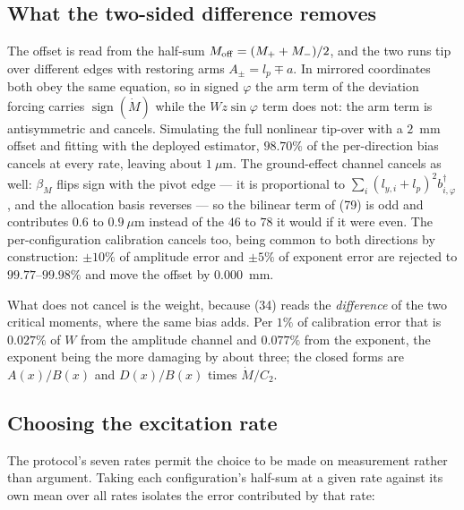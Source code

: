 \documentclass[10pt]{article}
\newcommand{\Mdot}{\dot M}
\begin{document}
\subsection{What the two-sided difference removes}

The offset is read from the half-sum $M_{\rm off} = (M_+ + M_-)/2$, and
the two runs tip over different edges with restoring arms
$A_\pm = l_p\mp a$. In mirrored coordinates both obey the same equation,
so in signed $\varphi$ the arm term of the deviation forcing carries
$\operatorname{sign}(\Mdot)$ while the $Wz\sin\varphi$ term does not: the
arm term is antisymmetric and cancels. Simulating the full nonlinear
tip-over with a $2$~mm offset and fitting with the deployed estimator,
$98.70\%$ of the per-direction bias cancels at every rate, leaving about
$1~\mu$m. The ground-effect channel cancels as well: $\beta_M$ flips
sign with the pivot edge --- it is proportional to
$\sum_i (l_{y,i}+l_p)^2 b^\dagger_{i,\varphi}$, and the allocation basis
reverses --- so the bilinear term of (79) is odd and contributes
$0.6$ to $0.9~\mu$m instead of the $46$ to $78$ it would if it were
even. The per-configuration calibration cancels too, being common to
both directions by construction: $\pm10\%$ of amplitude error and
$\pm5\%$ of exponent error are rejected to $99.77$--$99.98\%$ and move
the offset by $0.000$~mm.

What does not cancel is the weight, because (34) reads the
\emph{difference} of the two critical moments, where the same bias adds.
Per $1\%$ of calibration error that is $0.027\%$ of $W$ from the
amplitude channel and $0.077\%$ from the exponent, the exponent being
the more damaging by about three; the closed forms are
$A(x)/B(x)$ and $D(x)/B(x)$ times $\Mdot/C_2$.

\subsection{Choosing the excitation rate}

The protocol's seven rates permit the choice to be made on measurement
rather than argument. Taking each configuration's half-sum at a given
rate against its own mean over all rates isolates the error contributed
by that rate:
\end{document}
